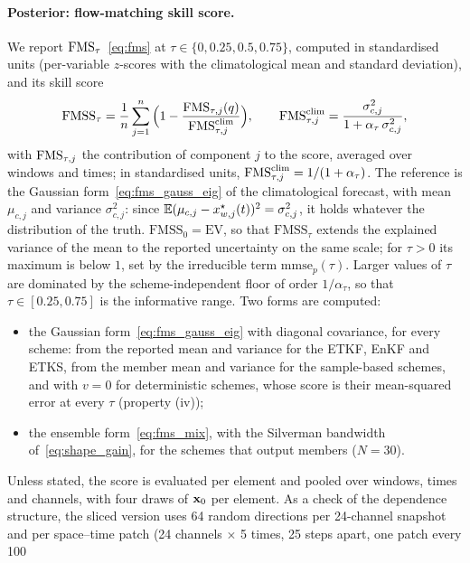 \paragraph{Posterior: flow-matching skill score.}
We report $\mathrm{FMS}_\tau$~\eqref{eq:fms} at $\tau \in \{0, 0.25, 0.5, 0.75\}$, computed in
standardised units (per-variable $z$-scores with the climatological mean and standard
deviation), and its skill score
\begin{equation}\label{eq:fmss}
  \mathrm{FMSS}_\tau = \frac{1}{n}\sum_{j=1}^{n}
  \Big(1 - \frac{\mathrm{FMS}_{\tau,j}(q)}{\mathrm{FMS}_{\tau,j}^{\mathrm{clim}}}\Big),
  \qquad
  \mathrm{FMS}_{\tau,j}^{\mathrm{clim}} = \frac{\sigma_{c,j}^2}{1+\alpha_\tau\,\sigma_{c,j}^2},
\end{equation}
with $\mathrm{FMS}_{\tau,j}$ the contribution of component $j$ to the score, averaged over
windows and times; in standardised units, $\mathrm{FMS}_{\tau,j}^{\mathrm{clim}} = 1/(1+\alpha_\tau)$.
The reference is the Gaussian form~\eqref{eq:fms_gauss_eig} of the climatological
forecast, with mean $\mu_{c,j}$ and variance $\sigma_{c,j}^2$: since
$\mathbb{E}(\mu_{c,j} - x^\star_{w,j}(t))^2 = \sigma_{c,j}^2$, it holds whatever the distribution
of the truth. $\mathrm{FMSS}_0 = \mathrm{EV}$, so that
$\mathrm{FMSS}_\tau$ extends the explained variance of the mean to the reported
uncertainty on the same scale; for $\tau > 0$ its maximum is below $1$, set by the
irreducible term $\mathrm{mmse}_p(\tau)$. Larger values of $\tau$ are dominated by the
scheme-independent floor of order $1/\alpha_\tau$, so that $\tau \in [0.25, 0.75]$ is
the informative range. Two forms are computed:
\begin{itemize}[leftmargin=*,nosep]
  \item the Gaussian form~\eqref{eq:fms_gauss_eig} with diagonal covariance, for
    every scheme: from the reported mean and variance for the ETKF, EnKF and ETKS,
    from the member mean and variance for the sample-based schemes, and with
    $v = 0$ for deterministic schemes, whose score is their mean-squared error at
    every $\tau$ (property (iv));
  \item the ensemble form~\eqref{eq:fms_mix}, with the Silverman bandwidth
    of~\eqref{eq:shape_gain}, for the schemes that output members ($N = 30$).
\end{itemize}
Unless stated, the score is evaluated per element and pooled over windows, times and
channels, with four draws of $\mathbf{x}_0$ per element. As a check of the dependence
structure, the sliced version uses 64 random directions per 24-channel snapshot and per
space--time patch (24 channels $\times$ 5 times, 25 steps apart, one patch every 100
